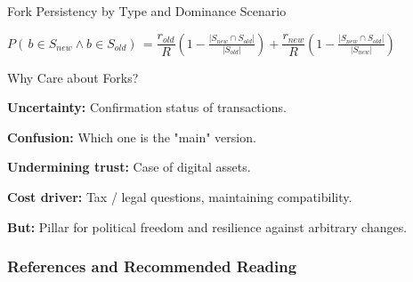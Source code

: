 \documentclass[handout]{beamer}
\begin{document}
\begin{frame}{Fork Persistency by Type and Dominance Scenario}

\center \footnotesize
$P(\,b \in S_{new} \wedge b \in S_{old})\, = \dfrac{r_{old}}{R} \left( 1-\frac{|S_{new} \cap S_{old}|}{|S_{old}|}\right) + \dfrac{r_{new}}{R} \left( 1-\frac{|S_{new} \cap S_{old}|}{|S_{new}|}\right)$ 
\label{eq:forkprobability}

\vspace{1.5em}


	\begin{table}
		
		\caption{Persistency by fork type and scenario \cite{schar2020blockchain}}
		\label{tbl:forkpersistencies}
	\end{table}

	


	
\end{frame}



\begin{frame}{Why Care about Forks?}

\textbf{Uncertainty:} Confirmation status of transactions.
\vspace{1.5em}

\textbf{Confusion:} Which one is the "main" version.
\vspace{1.5em}

\textbf{Undermining trust:} Case of digital assets.
\vspace{1.5em}

\textbf{Cost driver:} Tax / legal questions, maintaining compatibility.
\vspace{1.5em}

\color{focus} \textbf{But:} \color{black} Pillar for political freedom and resilience against arbitrary changes.

	
\end{frame}

\begin{frame}%
\frametitle{References and Recommended Reading}

	
	

\end{frame}
\end{document}
